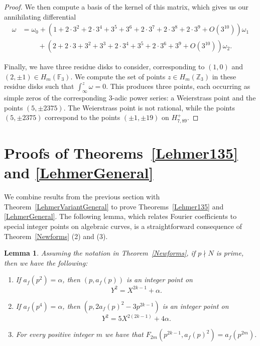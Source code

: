 \documentclass[12pt]{amsart}
\newtheorem{lem}{Lemma}[section]
\newcommand{\Z}{\mathbb{Z}}
\newcommand{\F}{\mathbb{F}}
\newcommand{\?}{\color{red}?}
\numberwithin{equation}{section}
\begin{document}
\begin{proof}
\normalsize

We then compute a basis of the kernel of this matrix, which gives us our annihilating differential 
\begin{align*}\omega &= \omega_0 + (1 + 2 \cdot 3^{2} + 2 \cdot 3^{4} + 3^{5} + 3^{6} + 2 \cdot 3^{7} + 2 \cdot 3^{8} + 2 \cdot 3^{9} +  O(3^{10})) \omega_1 \\
&\qquad\; + (2 + 2 \cdot 3 + 3^{2} + 3^{3} + 2 \cdot 3^{4} + 3^{5} + 2 \cdot 3^{6} + 3^{9} + O(3^{10}))\omega_2.
\end{align*}

Finally, we have three residue disks to consider, corresponding to $(1,0)$ and $(2, \pm 1) \in H_{m}(\F_3)$. We compute the set of points $z \in H_m(\Z_3)$ in these residue disks such that $\int_{\infty}^z \omega = 0$. This produces three points, each occurring as simple zeros of the corresponding $3$-adic power series: a Weierstrass point and the points $(5, \pm 2375).$
The Weierstrass point is not rational, while the points $(5, \pm 2375)$ correspond to the points $( \pm 1, \pm 19)$ on $H^{+}_{7,89}$.
\end{proof}


\section{Proofs of Theorems~\ref{Lehmer135} and \ref{LehmerGeneral}}

We combine  results from the previous section with
Theorem~\ref{LehmerVariantGeneral} to prove Theorems~\ref{Lehmer135} and \ref{LehmerGeneral}.
The following lemma, which relates Fourier coefficients to special integer points on algebraic curves, is a straightforward consequence of Theorem~\ref{Newforms} (2) and (3).

\begin{lem}\label{DiophantineCriterion}
Assuming the notation in Theorem~\ref{Newforms}, if $p\nmid N$ is prime, then
we have the following:
\begin{enumerate}
\item If $a_f(p^2)=\alpha$, then $(p,a_f(p))$ is an integer point on
$$
Y^2=X^{2k-1}+\alpha.
$$
\item If $a_f(p^4)=\alpha$, then $(p,2a_f(p)^2-3p^{2k-1})$ is an integer point on
$$
Y^2=5X^{2(2k-1)}+4\alpha.
$$
\item For every positive integer $m$ we have that
$F_{2m}(p^{2k-1},a_f(p)^2)=a_f(p^{2m}).$
\end{enumerate}
\end{lem}
\end{document}
